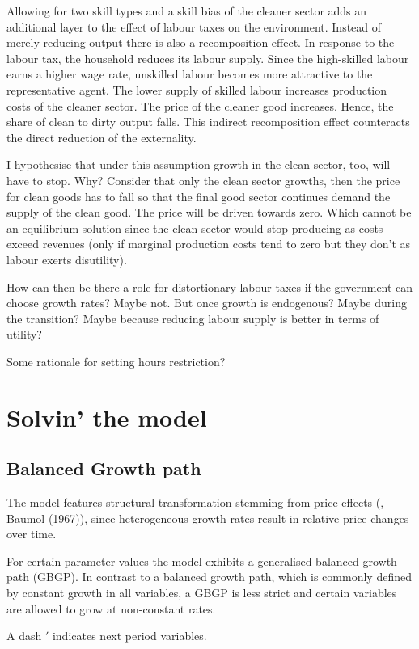 Allowing for two skill types and a skill bias of the cleaner sector adds an additional layer to the effect of labour taxes on the environment. Instead of merely reducing output there is also a recomposition effect. 
In response to the labour tax, the household reduces its labour supply. Since the high-skilled labour earns a higher wage rate, unskilled labour becomes more attractive to the representative agent. The lower supply of skilled labour increases production costs of the cleaner sector. The price of the cleaner good increases. Hence, the share of clean to dirty output falls. This indirect recomposition effect counteracts the direct reduction of the externality. 

I hypothesise that under this assumption growth in the clean sector, too, will have to stop. Why? Consider that only the clean sector growths, then the price for clean goods has to fall so that the final good sector  continues demand the supply of the clean good. The price will be driven towards zero. Which cannot be an equilibrium solution since the clean sector would stop producing as costs exceed revenues (only if marginal production costs tend to zero but they don't as labour exerts disutility).

How can then be there a role for distortionary labour taxes if the government can choose growth rates? Maybe not. But once growth is endogenous? Maybe during the transition? 
Maybe because reducing labour supply is better in terms of utility? 

Some rationale for setting hours restriction? 

\section{Solvin' the model}
\subsection{Balanced Growth path}
 The model features structural transformation stemming from price effects (\cite{Ngai2007StructuralGrowth}, Baumol (1967)), since heterogeneous growth rates result in relative price changes over time. 
 
For certain parameter values the model exhibits a generalised balanced growth path (GBGP). In contrast to a balanced growth path, which is commonly defined by constant growth in all variables, a GBGP is less strict and certain variables are allowed to grow at non-constant rates. 


A dash $'$ indicates next period variables.  


